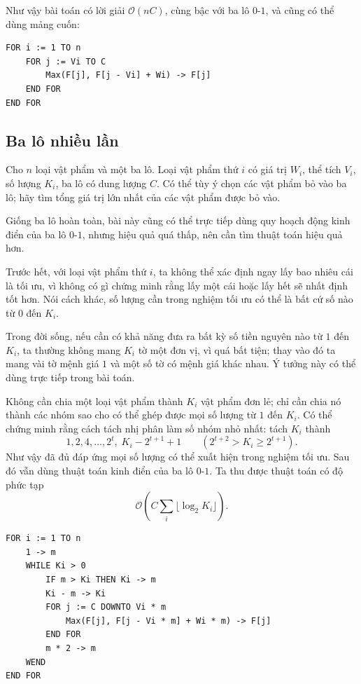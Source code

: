 \documentclass[11pt]{article}
\newcommand{\Oh}{\mathcal{O}}
\begin{document}
Như vậy bài toán có lời giải \(\Oh(nC)\), cùng bậc với ba lô \(0\)-\(1\), và
cũng có thể dùng mảng cuốn:

\begin{verbatim}
FOR i := 1 TO n
    FOR j := Vi TO C
        Max(F[j], F[j - Vi] + Wi) -> F[j]
    END FOR
END FOR
\end{verbatim}

\subsection{Ba lô nhiều lần}

Cho \(n\) loại vật phẩm và một ba lô. Loại vật phẩm thứ \(i\) có giá trị
\(W_i\), thể tích \(V_i\), số lượng \(K_i\), ba lô có dung lượng \(C\). Có thể
tùy ý chọn các vật phẩm bỏ vào ba lô; hãy tìm tổng giá trị lớn nhất của các
vật phẩm được bỏ vào.

Giống ba lô hoàn toàn, bài này cũng có thể trực tiếp dùng quy hoạch động kinh
điển của ba lô \(0\)-\(1\), nhưng hiệu quả quá thấp, nên cần tìm thuật toán
hiệu quả hơn.

Trước hết, với loại vật phẩm thứ \(i\), ta không thể xác định ngay lấy bao
nhiêu cái là tối ưu, vì không có gì chứng minh rằng lấy một cái hoặc lấy hết
sẽ nhất định tốt hơn. Nói cách khác, số lượng cần trong nghiệm tối ưu có thể
là bất cứ số nào từ \(0\) đến \(K_i\).

Trong đời sống, nếu cần có khả năng đưa ra bất kỳ số tiền nguyên nào từ \(1\)
đến \(K_i\), ta thường không mang \(K_i\) tờ một đơn vị, vì quá bất tiện; thay
vào đó ta mang vài tờ mệnh giá \(1\) và một số tờ có mệnh giá khác nhau. Ý
tưởng này có thể dùng trực tiếp trong bài toán.

Không cần chia một loại vật phẩm thành \(K_i\) vật phẩm đơn lẻ; chỉ cần chia
nó thành các nhóm sao cho có thể ghép được mọi số lượng từ \(1\) đến \(K_i\).
Có thể chứng minh rằng cách tách nhị phân làm số nhóm nhỏ nhất: tách \(K_i\)
thành
\[
  1,2,4,\ldots,2^t,\;K_i-2^{t+1}+1
  \qquad (2^{t+2}>K_i\ge 2^{t+1}).
\]
Như vậy đã đủ đáp ứng mọi số lượng có thể xuất hiện trong nghiệm tối ưu. Sau
đó vẫn dùng thuật toán kinh điển của ba lô \(0\)-\(1\). Ta thu được thuật toán
có độ phức tạp
\[
  \Oh\!\left(C\sum_i \lfloor \log_2 K_i\rfloor\right).
\]

\begin{verbatim}
FOR i := 1 TO n
    1 -> m
    WHILE Ki > 0
        IF m > Ki THEN Ki -> m
        Ki - m -> Ki
        FOR j := C DOWNTO Vi * m
            Max(F[j], F[j - Vi * m] + Wi * m) -> F[j]
        END FOR
        m * 2 -> m
    WEND
END FOR
\end{verbatim}
\end{document}
